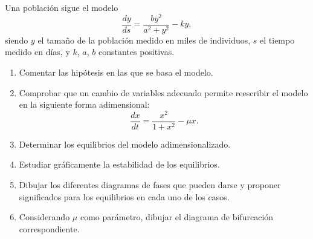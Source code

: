 \documentclass[11pt]{report}
\begin{document}
\begin{exercise}[Junio de 2022]
    Una población sigue el modelo
    \[\frac{dy}{ds} = \frac{by^2}{a^2+y^2}-ky,\]
    siendo $y$ el tamaño de la población medido en miles de individuos, $s$ el tiempo medido en días, y $k$, $a$, $b$ constantes positivas.
    \begin{enumerate}
        \item Comentar las hipótesis en las que se basa el modelo.
        \item Comprobar que un cambio de variables adecuado permite reescribir el modelo en la siguiente forma adimensional:
        \[\frac{dx}{dt} = \frac{x^2}{1+x^2}-\mu x.\]
        \item Determinar los equilibrios del modelo adimensionalizado.
        \item Estudiar gráficamente la estabilidad de los equilibrios.
        \item Dibujar los diferentes diagramas de fases que pueden darse y proponer significados para los equilibrios en cada uno de los casos.
        \item Considerando $\mu$ como parámetro, dibujar el diagrama de bifurcación correspondiente.
    \end{enumerate}
\end{exercise}
\end{document}

